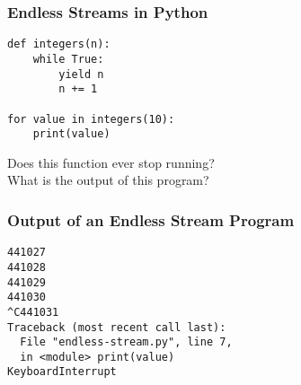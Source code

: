 \documentclass[14pt,aspectratio=169]{beamer}
\begin{document}
%
\begin{frame}[fragile]
  \frametitle{Endless Streams in Python}
  \normalsize
  \begin{minipage}{6in}
    \vspace*{.1in}
    \begin{verbatim}
def integers(n):
    while True:
        yield n
        n += 1

for value in integers(10):
    print(value)
    \end{verbatim}
  \end{minipage}
  \vspace*{.05in}
  \begin{center}
    \normalsize \noindent Does this function ever stop running? \\
    \normalsize \noindent What is the output of this program? \\
  \end{center}
\end{frame}

%
\begin{frame}[fragile]
  \frametitle{Output of an Endless Stream Program}
  \normalsize
  \begin{minipage}{6in}
    \vspace*{.1in}
    \begin{verbatim}
441027
441028
441029
441030
^C441031
Traceback (most recent call last):
  File "endless-stream.py", line 7,
  in <module> print(value)
KeyboardInterrupt
    \end{verbatim}
  \end{minipage}
\end{frame}
\end{document}
